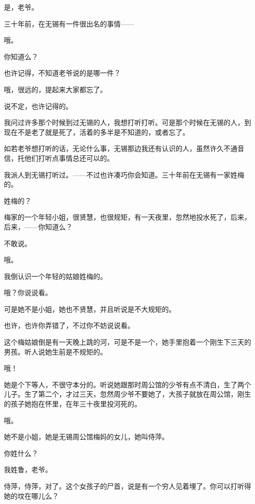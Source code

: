 是，老爷。

三十年前，在无锡有一件很出名的事情——

哦。

你知道么？

也许记得，不知道老爷说的是哪一件？

哦，很远的，提起来大家都忘了。

说不定，也许记得的。

我问过许多那个时候到过无锡的人，我想打听打听。可是那个时候在无锡的人，到现在不是老了就是死了，活着的多半是不知道的，或者忘了。

如若老爷想打听的话，无论什么事，无锡那边我还有认识的人，虽然许久不通音信，托他们打听点事情总还可以的。

我派人到无锡打听过。——不过也许凑巧你会知道。三十年前在无锡有一家姓梅的。

姓梅的？

梅家的一个年轻小姐，很贤慧，也很规矩，有一天夜里，忽然地投水死了，后来，后来，——你知道么？

不敢说。

哦。

我倒认识一个年轻的姑娘姓梅的。

哦？你说说看。

可是她不是小姐，她也不贤慧，并且听说是不大规矩的。

也许，也许你弄错了，不过你不妨说说看。

这个梅姑娘倒是有一天晚上跳的河，可是不是一个，她手里抱着一个刚生下三天的男孩。听人说她生前是不规矩的。

哦！

她是个下等人，不很守本分的。听说她跟那时周公馆的少爷有点不清白，生了两个儿子。生了第二个，才过三天，忽然周少爷不要她了，大孩子就放在周公馆，刚生的孩子她抱在怀里，在年三十夜里投河死的。

哦。

她不是小姐，她是无锡周公馆梅妈的女儿，她叫侍萍。

你姓什么？

我姓鲁，老爷。

侍萍，侍萍，对了。这个女孩子的尸首，说是有一个穷人见着埋了。你可以打听得她的坟在哪儿么？


